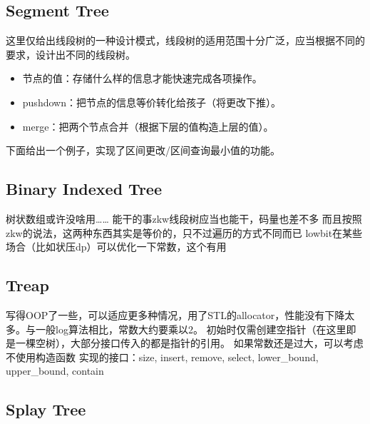 \documentclass[twoside, UTF8]{article}
\begin{document}
		\subsection{Segment Tree}
			\begin{flushleft}
				这里仅给出线段树的一种设计模式，线段树的适用范围十分广泛，应当根据不同的要求，设计出不同的线段树。
				\begin{itemize}
					\item 节点的值：存储什么样的信息才能快速完成各项操作。
					\item pushdown：把节点的信息等价转化给孩子（将更改下推）。
					\item merge：把两个节点合并（根据下层的值构造上层的值）。
				\end{itemize}
				下面给出一个例子，实现了区间更改/区间查询最小值的功能。
			\end{flushleft}
			
		\subsection{Binary Indexed Tree}
			\begin{flushleft}
				树状数组或许没啥用……
				\linebreak 能干的事zkw线段树应当也能干，码量也差不多
				\linebreak 而且按照zkw的说法，这两种东西其实是等价的，只不过遍历的方式不同而已
				\linebreak lowbit在某些场合（比如状压dp）可以优化一下常数，这个有用
			\end{flushleft}
			
		\subsection{Treap}
			\begin{flushleft}
				写得OOP了一些，可以适应更多种情况，用了STL的allocator，性能没有下降太多。与一般log算法相比，常数大约要乘以2。
				\linebreak 初始时仅需创建空指针（在这里即是一棵空树），大部分接口传入的都是指针的引用。
				\linebreak 如果常数还是过大，可以考虑不使用构造函数
				\linebreak 实现的接口：size, insert, remove, select, lower\_bound, upper\_bound, contain
			\end{flushleft}
			
		\subsection{Splay Tree}
			
	\newpage
\end{document}
